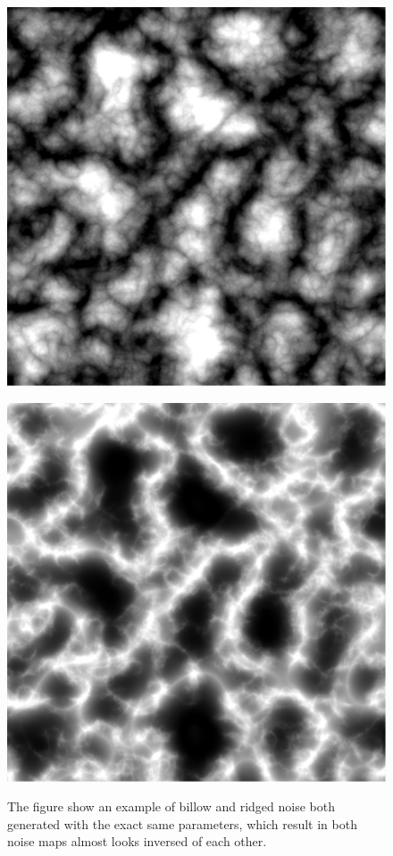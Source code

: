 \begin{figure}[H]
	\begin{minipage}[b]{.49\linewidth}
		\includegraphics[width=0.95\linewidth]{img/Billow}
		\label{fig:4a}
	\end{minipage}
	\begin{minipage}[b]{.49\linewidth}
		\includegraphics[width=0.95\linewidth]{img/Ridged}
		\label{fig:4b}
	\end{minipage}
	\centering
	\caption{The figure show an example of billow and ridged noise both generated with the exact same parameters, which result in both noise maps almost looks inversed of each other.}
	\label{fig:BillowRidged}
\end{figure}



